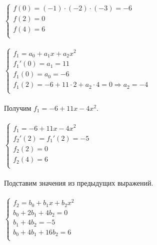 $  
\left\{  
\begin{array}{lcl}
f(0)=(-1)\cdot (-2)\cdot (-3)=-6\\
f(2)=0\\
f(4)=6\\
\end{array}   
\right.  
$
\\ \\
$  
\left\{  
\begin{array}{lcl}
f_1 = a_0+a_1x+a_2x^2\\
f_1'(0) = a_1 = 11\\
f_1(0) = a_0 = -6\\
f_1(2) = -6+11\cdot 2+a_2\cdot 4 = 0 \Rightarrow a_2 = -4\\
\end{array}   
\right.  
$
\\ \\
Получим $f_1 = -6+11x-4x^2$. \\ \\
$  
\left\{  
\begin{array}{lcl}
f_1 = -6+11x-4x^2\\
f_2'(2) = f_1'(2) = -5\\
f_2(2) = 0\\
f_2(4) = 6\\
\end{array}   
\right.  
$
\\ ~\\
Подставим значения из предыдущих выражений.\\ \\
$
\left\{  
\begin{array}{lcl}
f_2 = b_0+b_1x+b_2x^2\\
b_0+2b_1+4b_2 = 0\\
b_1+4b_2 = -5\\
b_0+4b_1+16b_2 = 6\\
\end{array}   
\right.  
$
\\ \\
